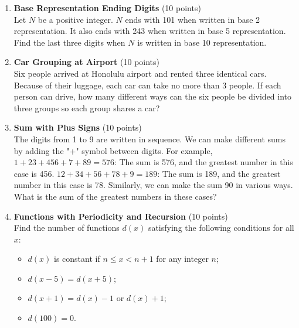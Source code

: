 \begin{enumerate}
  Next, we make pairs from right to left and do the same for each pair. Then, we make pairs from left to right and do the same for each pair. In each step, if the last number is not paired with any number, the number is left unchanged. If we continue these steps, what is the last number remaining?
  \begin{subanswer}
  \end{subanswer}

  \item \textbf{Base Representation Ending Digits} (10 points)\\
  Let $N$ be a positive integer. $N$ ends with 101 when written in base 2 representation. It also ends with 243 when written in base 5 representation. Find the last three digits when $N$ is written in base 10 representation.
  \begin{subanswer}
  \end{subanswer}

  \item \textbf{Car Grouping at Airport} (10 points)\\
  Six people arrived at Honolulu airport and rented three identical cars. Because of their luggage, each car can take no more than 3 people. If each person can drive, how many different ways can the six people be divided into three groups so each group shares a car?
  \begin{subanswer}
  \end{subanswer}

  \item \textbf{Sum with Plus Signs} (10 points)\\
  The digits from 1 to 9 are written in sequence. We can make different sums by adding the "+" symbol between digits. For example, $1+23+456+7+89=576$: The sum is 576, and the greatest number in this case is 456. $12+34+56+78+9=189$: The sum is 189, and the greatest number in this case is 78. Similarly, we can make the sum 90 in various ways. What is the sum of the greatest numbers in these cases?
  \begin{subanswer}
  \end{subanswer}

  \item \textbf{Functions with Periodicity and Recursion} (10 points)\\
  Find the number of functions $d(x)$ satisfying the following conditions for all $x$:
  \begin{itemize}
    \item $d(x)$ is constant if $n \leq x < n+1$ for any integer $n$;
    \item $d(x-5)=d(x+5)$;
    \item $d(x+1)=d(x)-1$ or $d(x)+1$;
    \item $d(100)=0$.
  \end{itemize}
  \begin{subanswer}
  \end{subanswer}


\end{enumerate}
